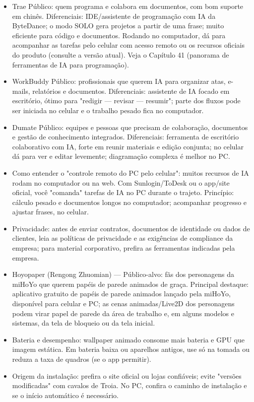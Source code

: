 \begin{itemize}
  \item Trae Público: quem programa e colabora em documentos, com bom suporte em chinês. Diferenciais: IDE/assistente de programação com IA da ByteDance; o modo SOLO gera projetos a partir de uma frase; muito eficiente para código e documentos. Rodando no computador, dá para acompanhar as tarefas pelo celular com acesso remoto ou os recursos oficiais do produto (consulte a versão atual). Veja o Capítulo 41 (panorama de ferramentas de IA para programação).
  \item WorkBuddy Público: profissionais que querem IA para organizar atas, e-mails, relatórios e documentos. Diferenciais: assistente de IA focado em escritório, ótimo para "redigir — revisar — resumir"; parte dos fluxos pode ser iniciada no celular e o trabalho pesado fica no computador.
  \item Dumate Público: equipes e pessoas que precisam de colaboração, documentos e gestão de conhecimento integrados. Diferenciais: ferramenta de escritório colaborativo com IA, forte em reunir materiais e edição conjunta; no celular dá para ver e editar levemente; diagramação complexa é melhor no PC.
  \item Como entender o "controle remoto do PC pelo celular": muitos recursos de IA rodam no computador ou na web. Com Sunlogin/ToDesk ou o app/site oficial, você "comanda" tarefas de IA no PC durante o trajeto. Princípio: cálculo pesado e documentos longos no computador; acompanhar progresso e ajustar frases, no celular.
  \item Privacidade: antes de enviar contratos, documentos de identidade ou dados de clientes, leia as políticas de privacidade e as exigências de compliance da empresa; para material corporativo, prefira as ferramentas indicadas pela empresa.
\end{itemize}


\begin{itemize}
  \item Hoyopaper (Rengong Zhuomian) — Público-alvo: fãs dos personagens da miHoYo que querem papéis de parede animados de graça. Principal destaque: aplicativo gratuito de papéis de parede animados lançado pela miHoYo, disponível para celular e PC; as cenas animadas/Live2D dos personagens podem virar papel de parede da área de trabalho e, em alguns modelos e sistemas, da tela de bloqueio ou da tela inicial.
  \item Bateria e desempenho: wallpaper animado consome mais bateria e GPU que imagem estática. Em bateria baixa ou aparelhos antigos, use só na tomada ou reduza a taxa de quadros (se o app permitir).
  \item Origem da instalação: prefira o site oficial ou lojas confiáveis; evite "versões modificadas" com cavalos de Troia. No PC, confira o caminho de instalação e se o início automático é necessário.
\end{itemize}


